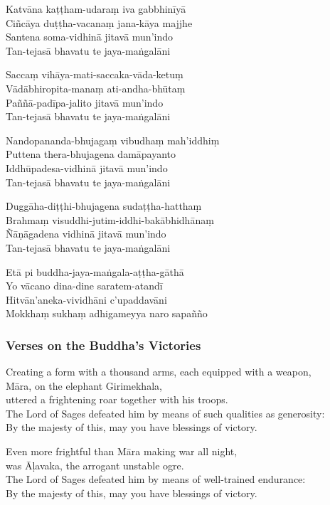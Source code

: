 \begin{paritta}
\begin{paritta}
Katvāna kaṭṭham-udaraṃ iva gabbhinīyā\\
Ciñcāya duṭṭha-vacanaṃ jana-kāya majjhe\\
Santena soma-vidhinā jitavā mun'indo\\
Tan-tejasā bhavatu te jaya-maṅgalāni

Saccaṃ vihāya-mati-saccaka-vāda-ketuṃ\\
Vādābhiropita-manaṃ ati-andha-bhūtaṃ\\
Paññā-padīpa-jalito jitavā mun'indo\\
Tan-tejasā bhavatu te jaya-maṅgalāni

Nandopananda-bhujagaṃ vibudhaṃ mah'iddhiṃ\\
Puttena thera-bhujagena damāpayanto\\
Iddhūpadesa-vidhinā jitavā mun'indo\\
Tan-tejasā bhavatu te jaya-maṅgalāni

Duggāha-diṭṭhi-bhujagena sudaṭṭha-hatthaṃ\\
Brahmaṃ visuddhi-jutim-iddhi-bakābhidhānaṃ\\
Ñāṇāgadena vidhinā jitavā mun'indo\\
Tan-tejasā bhavatu te jaya-maṅgalāni

Etā pi buddha-jaya-maṅgala-aṭṭha-gāthā\\
Yo vācano dina-dine saratem-atandī\\
Hitvān'aneka-vividhāni c'upaddavāni\\
Mokkhaṃ sukhaṃ adhigameyya naro sapañño
\end{paritta}

\subsubsection{Verses on the Buddha's Victories}


Creating a form with a thousand arms, each equipped with a weapon,\\
Māra, on the elephant Girimekhala,\\
uttered a frightening roar together with his troops.\\
The Lord of Sages defeated him by means of such qualities as generosity:\\
By the majesty of this, may you have blessings of victory.

Even more frightful than Māra making war all night,\\
was Āḷavaka, the arrogant unstable ogre.\\
The Lord of Sages defeated him by means of well-trained endurance:\\
By the majesty of this, may you have blessings of victory.


\end{paritta}
